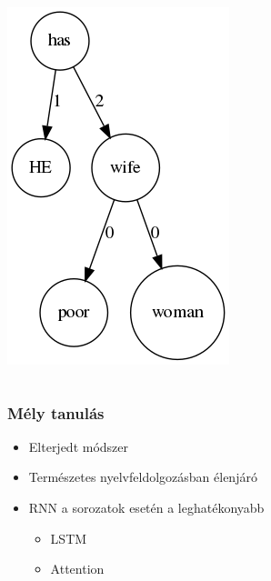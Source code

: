 \documentclass[bigger]{beamer}
\begin{document}
\begin{frame}
\begin{columns}
\begin{column}{0.3\textwidth}
	\pause \includegraphics[scale=0.4]{pics/wifeexp.png}
	\end{column}
\end{columns}
\end{frame}


\begin{frame}
	\frametitle{M\'ely tanul\'as}
	\begin{itemize}
		\pause \item Elterjedt m\'odszer
		\pause \item Term\'eszetes nyelvfeldolgoz\'asban \'elenj\'ar\'o
		\pause \item RNN a sorozatok eset\'en a leghat\'ekonyabb
		\begin{itemize}
			\pause \item LSTM
			\pause \item Attention
		\end{itemize}
	\end{itemize}
\end{frame}

\end{document}
